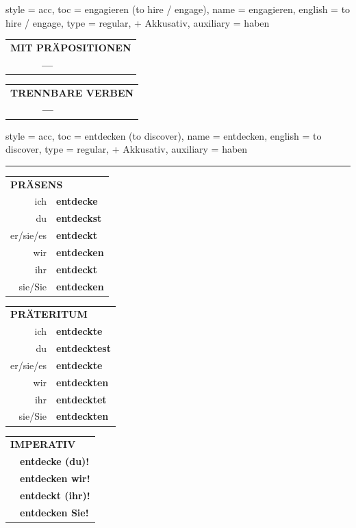 \begin{verbentry}{
  style = {acc},
  toc = {engagieren (to hire / engage)},
  name = {engagieren},
  english = {to hire / engage},
  type = {regular, + Akkusativ},
  auxiliary = {haben}
}
\vspace{10pt}

\begin{tabular}{lll}
\multicolumn{3}{l}{\textbf{MIT PRÄPOSITIONEN}}\\
& \textbf{---} & \\
\end{tabular}
\hfill
\begin{tabular}{lll}
\multicolumn{3}{l}{\textbf{TRENNBARE VERBEN}}\\
& \textbf{---} & \\
\end{tabular}

\vspace{-5pt}
\end{verbentry}

\begin{verbentry}{
  style = {acc},
  toc = {entdecken (to discover)},
  name = {entdecken},
  english = {to discover},
  type = {regular, + Akkusativ},
  auxiliary = {haben}
}


\vspace{5pt}
\hrule
\vspace{5pt}

\begin{tabular}{rl}
\multicolumn{2}{l}{\textbf{PRÄSENS}}\\
ich & \textbf{entdecke}\\
du & \textbf{entdeckst}\\
er/sie/es & \textbf{entdeckt}\\
wir & \textbf{entdecken}\\
ihr & \textbf{entdeckt}\\
sie/Sie & \textbf{entdecken}\\
\end{tabular}
\hfill
\begin{tabular}{rl}
\multicolumn{2}{l}{\textbf{PRÄTERITUM}}\\
ich & \textbf{entdeckte}\\
du & \textbf{entdecktest}\\
er/sie/es & \textbf{entdeckte}\\
wir & \textbf{entdeckten}\\
ihr & \textbf{entdecktet}\\
sie/Sie & \textbf{entdeckten}\\
\end{tabular}
\hfill
\begin{tabular}{rl}
\multicolumn{2}{l}{\textbf{IMPERATIV}}\\
& \textbf{entdecke (du)!}\\
& \textbf{entdecken wir!}\\
& \textbf{entdeckt (ihr)!}\\
& \textbf{entdecken Sie!}\\
\end{tabular}


\end{verbentry}
